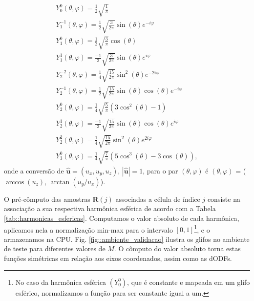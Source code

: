\begin{equation}
\begin{array}{l}
Y_{0}^{0}(\theta, \varphi)=\frac{1}{2} \sqrt{\frac{1}{\pi}} \\
Y_{1}^{-1}(\theta, \varphi)=\frac{1}{2} \sqrt{\frac{3}{2 \pi}} \sin (\theta) e^{-i \varphi} \\
Y_{1}^{0}(\theta, \varphi)=\frac{1}{2} \sqrt{\frac{3}{\pi}} \cos (\theta) \\
Y_{1}^{1}(\theta, \varphi)=\frac{-1}{2} \sqrt{\frac{3}{2 \pi}} \sin (\theta) e^{i \varphi} \\
Y_{2}^{-2}(\theta, \varphi)=\frac{1}{4} \sqrt{\frac{15}{2 \pi}} \sin ^{2} (\theta) e^{-2 i \varphi} \\
Y_{2}^{-1}(\theta, \varphi)=\frac{1}{2} \sqrt{\frac{15}{2 \pi}} \sin (\theta) \cos (\theta) e^{-i \varphi} \\
Y_{2}^{0}(\theta, \varphi)=\frac{1}{4} \sqrt{\frac{5}{\pi}}\left(3 \cos ^{2} (\theta)-1\right) \\
Y_{2}^{1}(\theta, \varphi)=\frac{-1}{2} \sqrt{\frac{15}{2 \pi}} \sin (\theta) \cos (\theta) e^{i \varphi} \\
Y_{2}^{2}(\theta, \varphi)=\frac{1}{4} \sqrt{\frac{15}{2 \pi}} \sin ^{2} (\theta) e^{2 i \varphi} \\
Y_{3}^{0}(\theta, \varphi)=\frac{1}{4} \sqrt{\frac{7}{\pi}}\left(5 \cos ^{3} (\theta)-3 \cos (\theta)\right) ,
\end{array} 
\end{equation}
onde a conversão de $\mathbf{\hat{u}} = (u_x, u_y, u_z)$, $|\mathbf{\hat{u}}| = 1$, para o par $(\theta, \varphi)$ é $(\theta, \varphi)$ = ($\arccos (u_z)$, $\arctan (u_y/u_x)$).

O pré-cômputo das amostras $\boldsymbol{R}(j)$ associadas a célula de índice $j$ consiste na associação a sua respectiva harmônica esférica de acordo com a Tabela \ref{tab::harmonicas_esfericas}. Computamos o valor absoluto de cada harmônica, aplicamos nela a normalização min-max para o intervalo $[0, 1]$\footnote{No caso da harmônica esférica $(Y_0^0)$, que é constante e mapeada em um glifo esférico, normalizamos a função para ser constante igual a um.}, e o armazenamos na CPU. Fig. \ref{fig::ambiente_validacao} ilustra os glifos no ambiente de teste para diferentes valores de $M$. O cômputo do valor absoluto torna estas funções simétricas em relação aos eixos coordenados, assim como as dODFs.





